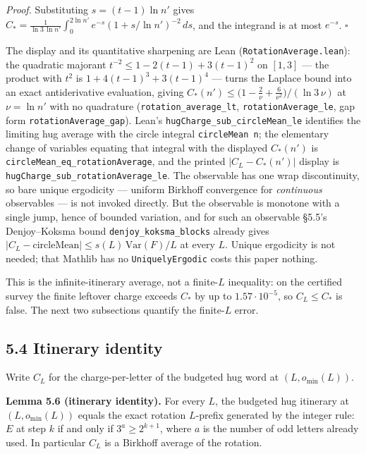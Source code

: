 \documentclass[12pt]{article}
\begin{document}
\emph{Proof.} Substituting \(s=(t-1)\ln n'\) gives
\(C_*=\frac1{\ln 3\,\ln n'}\int_0^{2\ln n'}
e^{-s}(1+s/\ln n')^{-2}\,ds\), and the integrand is at most \(e^{-s}\).
\(\square\)

The display and its quantitative sharpening are Lean
(\texttt{\nolinkurl{RotationAverage.lean}}): the quadratic majorant
\(t^{-2}\le 1-2(t-1)+3(t-1)^2\) on \([1,3]\) --- the product with
\(t^2\) is \(1+4(t-1)^3+3(t-1)^4\) --- turns the Laplace bound into an
exact antiderivative evaluation, giving
\(C_*(n')\le\bigl(1-\tfrac2\nu+\tfrac6{\nu^2}\bigr)/(\ln 3\,\nu)\) at
\(\nu=\ln n'\) with no quadrature
(\texttt{\nolinkurl{rotation_average_lt}},
\texttt{\nolinkurl{rotationAverage_le}}, gap form
\texttt{\nolinkurl{rotationAverage_gap}}). Lean's
\texttt{\nolinkurl{hugCharge_sub_circleMean_le}} identifies the limiting
hug average with the circle integral
\texttt{circleMean\ n\textquotesingle{}}; the elementary change of
variables equating that integral with the displayed \(C_*(n')\) is
\texttt{\nolinkurl{circleMean_eq_rotationAverage}}, and the printed
\(|C_L-C_*(n')|\) display is
\texttt{\nolinkurl{hugCharge_sub_rotationAverage_le}}. The observable
has one wrap discontinuity, so bare unique ergodicity --- uniform
Birkhoff convergence for \emph{continuous} observables --- is not
invoked directly. But the observable is monotone with a single jump,
hence of bounded variation, and for such an observable §5.5's
Denjoy--Koksma bound \texttt{\nolinkurl{denjoy_koksma_blocks}} already
gives \(|C_L-\mathrm{circleMean}|\le s(L)\,\mathrm{Var}(F)/L\) at every
\(L\). Unique ergodicity is not needed; that Mathlib has no
\texttt{\nolinkurl{UniquelyErgodic}} costs this paper nothing.

This is the infinite-itinerary average, not a finite-\(L\) inequality:
on the certified survey the finite leftover charge exceeds \(C_*\) by up
to \(1.57\cdot 10^{-5}\), so \(C_L\le C_*\) is false. The next two
subsections quantify the finite-\(L\) error.

\subsection{5.4 Itinerary identity}\label{itinerary-identity}

Write \(C_L\) for the charge-per-letter of the budgeted hug word at
\((L,o_{\min}(L))\).

\textbf{Lemma 5.6 (itinerary identity).} For every \(L\), the budgeted
hug itinerary at \((L,o_{\min}(L))\) equals the exact rotation
\(L\)-prefix generated by the integer rule: \(E\) at step \(k\) if and
only if \(3^a\ge 2^{k+1}\), where \(a\) is the number of odd letters
already used. In particular \(C_L\) is a Birkhoff average of the
rotation.
\end{document}
